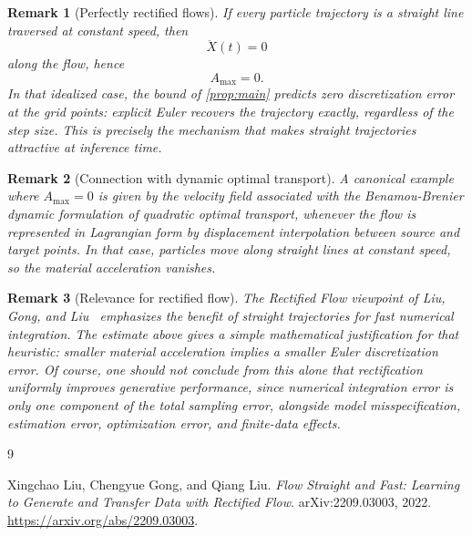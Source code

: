 \documentclass[11pt]{article}
\newtheorem{remark}{Remark}
\begin{document}
\begin{remark}[Perfectly rectified flows]
If every particle trajectory is a straight line traversed at constant speed, then
\[
\ddot X(t)=0
\]
along the flow, hence
\[
A_{\max}=0.
\]
In that idealized case, the bound of \cref{prop:main} predicts zero discretization error at the grid points: explicit Euler recovers the trajectory exactly, regardless of the step size. This is precisely the mechanism that makes straight trajectories attractive at inference time.
\end{remark}

\begin{remark}[Connection with dynamic optimal transport]
A canonical example where $A_{\max}=0$ is given by the velocity field associated with the Benamou-Brenier dynamic formulation of quadratic optimal transport, whenever the flow is represented in Lagrangian form by displacement interpolation between source and target points. In that case, particles move along straight lines at constant speed, so the material acceleration vanishes.
\end{remark}

\begin{remark}[Relevance for rectified flow]
The Rectified Flow viewpoint of Liu, Gong, and Liu~\cite{liu2022rectified} emphasizes the benefit of straight trajectories for fast numerical integration. The estimate above gives a simple mathematical justification for that heuristic: smaller material acceleration implies a smaller Euler discretization error. Of course, one should not conclude from this alone that rectification uniformly improves generative performance, since numerical integration error is only one component of the total sampling error, alongside model misspecification, estimation error, optimization error, and finite-data effects.
\end{remark}

\begin{thebibliography}{9}

Xingchao Liu, Chengyue Gong, and Qiang Liu.
\newblock \emph{Flow Straight and Fast: Learning to Generate and Transfer Data with Rectified Flow}.
\newblock arXiv:2209.03003, 2022.
\newblock \url{https://arxiv.org/abs/2209.03003}.

\end{thebibliography}
\end{document}
